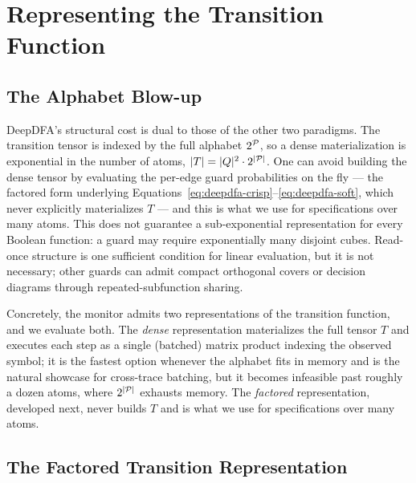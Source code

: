\section{Representing the Transition Function}
\label{sec:representation}

\subsection{The Alphabet Blow-up}
\label{sec:deepdfa-alphabet}

DeepDFA's structural cost is dual to those of the other two paradigms. The transition tensor is indexed by the full alphabet $2^{\mathcal{P}}$, so a dense materialization is exponential in the number of atoms, $|T| = |Q|^2 \cdot 2^{|{\mathcal{P}}|}$. One can avoid building the dense tensor by evaluating the per-edge guard probabilities on the fly --- the factored form underlying Equations~\eqref{eq:deepdfa-crisp}--\eqref{eq:deepdfa-soft}, which never explicitly materializes $T$ --- and this is what we use for specifications over many atoms. This does not guarantee a sub-exponential representation for every Boolean function: a guard may require exponentially many disjoint cubes. Read-once structure is one sufficient condition for linear evaluation, but it is not necessary; other guards can admit compact orthogonal covers or decision diagrams through repeated-subfunction sharing.

Concretely, the monitor admits two representations of the transition function, and we evaluate both. The \emph{dense} representation materializes the full tensor $T$ and executes each step as a single (batched) matrix product indexing the observed symbol; it is the fastest option whenever the alphabet fits in memory and is the natural showcase for cross-trace batching, but it becomes infeasible past roughly a dozen atoms, where $2^{|{\mathcal{P}}|}$ exhausts memory. The \emph{factored} representation, developed next, never builds $T$ and is what we use for specifications over many atoms.

\subsection{The Factored Transition Representation}
\label{sec:deepdfa-factored}

